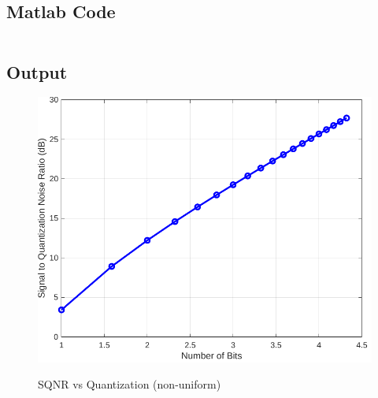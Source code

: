 \subsection{Matlab Code}

\inputminted[fontsize=\footnotesize,autogobble]{matlab}{code/sqnr2.m}
\subsection{Output}

\begin{figure}[!htb]
	\centering
	\includegraphics[width=5in]{res/figures/Figure_4.pdf}
	\label{output:SQNR vs quantization 2}
	\caption{SQNR vs Quantization (non-uniform)}
\end{figure}